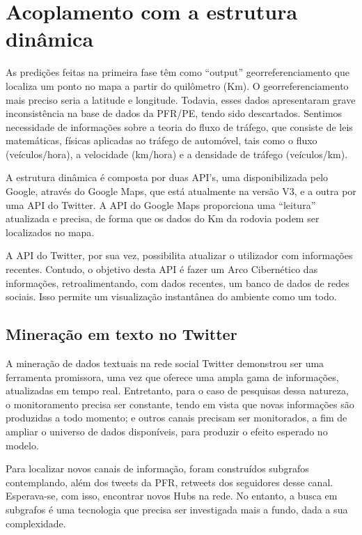 \pagebreak

\section{Acoplamento com a estrutura dinâmica}

As predições feitas na primeira fase têm como ``output'' georreferenciamento que localiza um ponto no mapa a partir do quilômetro (Km). O georreferenciamento mais preciso seria a latitude e longitude. Todavia, esses dados apresentaram grave inconsistência na base de dados da PFR/PE, tendo sido descartados. Sentimos necessidade de informações sobre a teoria do fluxo de tráfego, que consiste de leis matemáticas, físicas aplicadas ao tráfego de automóvel, tais como o fluxo (veículos/hora), a velocidade (km/hora) e a densidade de tráfego (veículos/km).

A estrutura dinâmica é composta por duas API's, uma disponibilizada pelo Google, através do Google Maps, que está atualmente na versão V3, e a
outra por uma API do Twitter. A API do Google Maps proporciona uma ``leitura'' atualizada e precisa, de forma que os dados do Km da rodovia podem ser localizados no mapa.

A API do Twitter, por sua vez, possibilita atualizar o utilizador com informações recentes. Contudo, o objetivo desta API é fazer 
um Arco Cibernético das informações, retroalimentando, com dados recentes, um banco de dados de redes sociais. Isso permite um visualização 
instantânea do ambiente como um todo.

\pagebreak

\subsection{Mineração em texto no Twitter}

A mineração de dados textuais na rede social Twitter demonstrou ser uma ferramenta promissora, uma vez que oferece uma ampla gama de informações, atualizadas em tempo real. Entretanto, para o caso de pesquisas dessa natureza, o monitoramento precisa ser constante, tendo em vista que novas informações são produzidas a todo momento; e outros canais precisam ser monitorados, a fim de ampliar o universo de dados disponíveis, para produzir o efeito esperado no modelo.

Para localizar novos canais de informação, foram construídos subgrafos contemplando, além dos tweets da PFR, retweets dos seguidores desse canal. Esperava-se, com isso, encontrar novos Hubs na rede. No entanto, a busca em subgrafos é uma tecnologia que precisa ser investigada mais a fundo, dada a sua complexidade.

